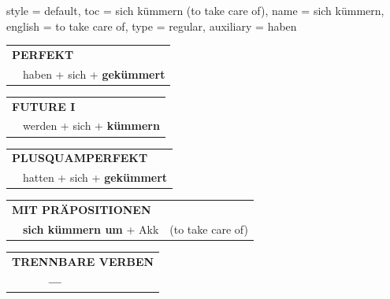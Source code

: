 \begin{verbentry}{
  style = {default},
  toc = {sich kümmern (to take care of)},
  name = {sich kümmern},
  english = {to take care of},
  type = {regular},
  auxiliary = {haben}
}
 \begin{tabular}{rl}
     \multicolumn{2}{l}{\textbf{PERFEKT}}\\
    &haben + sich + \textbf{gekümmert}\\
  \end{tabular}
\hfill
   \begin{tabular}{rl}
   
    \multicolumn{2}{l}{\textbf{FUTURE I} }\\
    &werden + sich + \textbf{kümmern}\\
 
  \end{tabular}
\hfill
   \begin{tabular}{rl}
      \multicolumn{2}{l}{\textbf{PLUSQUAMPERFEKT}}\\
    &hatten + sich + \textbf{gekümmert}\\
  \end{tabular}
  
\vspace{10pt}

   \begin{tabular}{lll}
      \multicolumn{3}{l}{\textbf{MIT PRÄPOSITIONEN}}\\
& \textbf{sich kümmern um} + Akk & (to take care of)
  \end{tabular}
  \hfill
   \begin{tabular}{lll}
\multicolumn{3}{l}{\textbf{TRENNBARE VERBEN}}\\
& \textbf{---} & \\
\end{tabular}
  
  \vspace{-5pt}
\end{verbentry}

